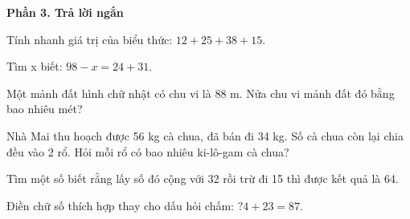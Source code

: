 \textbf{Phần 3. Trả lời ngắn}

\begin{ex} %
Tính nhanh giá trị của biểu thức: $12 + 25 + 38 + 15$.
\end{ex}

\begin{ex} %
Tìm x biết: $98 - x = 24 + 31$.
\end{ex}

\begin{ex} %
Một mảnh đất hình chữ nhật có chu vi là 88 m. Nửa chu vi mảnh đất đó bằng bao nhiêu mét?
\end{ex}

\begin{ex} %
Nhà Mai thu hoạch được 56 kg cà chua, đã bán đi 34 kg. Số cà chua còn lại chia đều vào 2 rổ. Hỏi mỗi rổ có bao nhiêu ki-lô-gam cà chua?
\end{ex}

\begin{ex} %
Tìm một số biết rằng lấy số đó cộng với 32 rồi trừ đi 15 thì được kết quả là 64.
\end{ex}

\begin{ex} %
Điền chữ số thích hợp thay cho dấu hỏi chấm: $?4 + 23 = 87$.
\end{ex}
